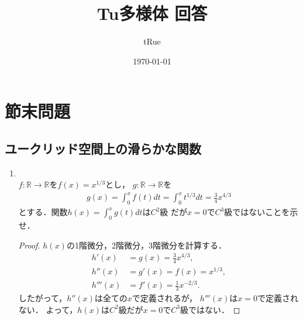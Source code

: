 \documentclass[dvipdfmx,a4paper,11pt]{jsarticle}
\begin{document}
\title{Tu多様体 回答}
\author{tRue}
\date{\today}
\maketitle

\section*{節末問題}

\subsection{ユークリッド空間上の滑らかな関数}
\begin{enumerate}
  \item {}\\
  $f\colon\mathbb{R}\to\mathbb{R}$を$f(x)=x^{1/3}$とし，
  $g\colon\mathbb{R}\to\mathbb{R}$を
  \begin{align}
    g(x)=\int_0^x f(t)dt=\int_0^xt^{1/3}dt=\frac{3}{4}x^{4/3}
  \end{align}
  とする．関数$h(x)=\int_0^xg(t)dt$は$C^2$級
  だが$x=0$で$C^3$級ではないことを示せ．
  \begin{proof}
    $h(x)$の1階微分，2階微分，3階微分を計算する．
    \begin{align}
      h'(x)&=g(x)=\frac{3}{4}x^{4/3},\\
      h''(x)&=g'(x)=f(x)=x^{1/3},\\
      h'''(x)&=f'(x)=\frac{1}{3}x^{-2/3}.
    \end{align}
    したがって，$h''(x)$は全ての$x$で定義されるが，
    $h'''(x)$は$x=0$で定義されない．
    よって，$h(x)$は$C^2$級だが$x=0$で$C^3$級ではない．
  \end{proof}
\end{enumerate}

\setcounter{subsection}{7}
\end{document}
